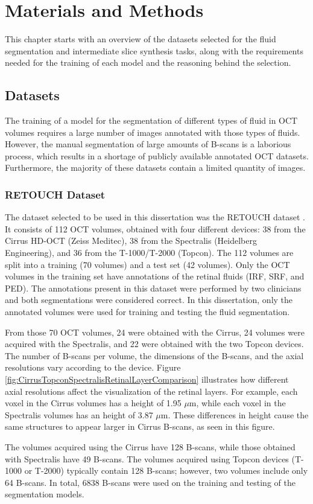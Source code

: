 \chapter{Materials and Methods}\label{Methods}
This chapter starts with an overview of the datasets selected for the fluid segmentation and intermediate slice synthesis tasks, along with the requirements needed for the training of each model and the reasoning behind the selection. 

\section{Datasets}
The training of a model for the segmentation of different types of fluid in OCT volumes requires a large number of images annotated with those types of fluids. However, the manual segmentation of large amounts of B-scans is a laborious process, which results in a shortage of publicly available annotated OCT datasets. Furthermore, the majority of these datasets contain a limited quantity of images.

\subsection{RETOUCH Dataset}

The dataset selected to be used in this dissertation was the RETOUCH dataset \parencite{Bogunovic2019b}. It consists of 112 OCT volumes, obtained with four different devices: 38 from the Cirrus HD-OCT (Zeiss Meditec), 38 from the Spectralis (Heidelberg Engineering), and 36 from the \mbox{T-1000}/T-2000 (Topcon). The 112 volumes are split into a training (70 volumes) and a test set (42 volumes). Only the OCT volumes in the training set have annotations of the retinal fluids (IRF, SRF, and PED). The annotations present in this dataset were performed by two clinicians and both segmentations were considered correct. In this dissertation, only the annotated volumes were used for training and testing the fluid segmentation.
\par
From those 70 OCT volumes, 24 were obtained with the Cirrus, 24 volumes were acquired with the Spectralis, and 22 were obtained with the two Topcon devices. The number of B-scans per volume, the dimensions of the B-scans, and the axial resolutions vary according to the device. Figure \ref{fig:CirrusTopconSpectralisRetinalLayerComparison} illustrates how different axial resolutions affect the visualization of the retinal layers. For example, each voxel in the Cirrus volumes has a height of 1.95 $\mu$m, while each voxel in the Spectralis volumes has an height of 3.87 $\mu$m. These differences in height cause the same structures to appear larger in Cirrus B-scans, as seen in this figure.
\par
The volumes acquired using the Cirrus have 128 B-scans, while those obtained with Spectralis have 49 B-scans. The volumes acquired using Topcon devices (\mbox{T-1000} or \mbox{T-2000}) typically contain 128 B-scans; however, two volumes include only 64 \mbox{B-scans}. In total, 6838 B-scans were used on the training and testing of the segmentation models.

